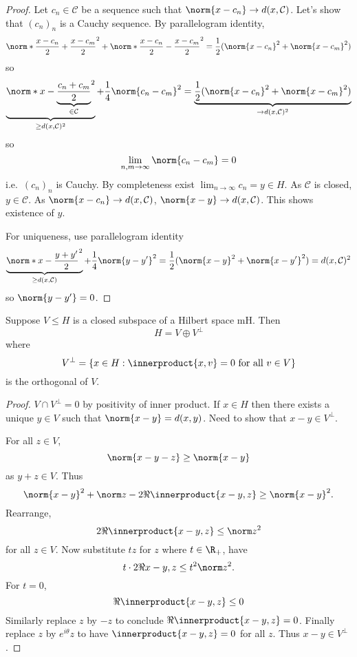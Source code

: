 \documentclass[a4paper]{article}
\newcommand*{\ip}{\innerproduct} %
\begin{document}
\begin{proof}
  Let \(c_n \in \mathcal C\) be a sequence such that \(\norm{x - c_n} \to d(x, \mathcal C)\). Let's show that \((c_n)_n\) is a Cauchy sequence. By parallelogram identity,
  \[
    \norm*{\frac{x - c_n}{2} + \frac{x - c_m}{2}}^2 + \norm*{\frac{x - c_n}{2} - \frac{x - c_m}{2}}^2 
    = \frac{1}{2} (\norm{x - c_n}^2 + \norm{x - c_m}^2)
  \]
  so
  \[
    \underbrace{\norm*{x - \underbrace{\frac{c_n + c_m}{2}}_{\in \mathcal C}}^2}_{\geq d(x, \mathcal C)^2} + \frac{1}{4} \norm{c_n - c_m}^2
    = \underbrace{\frac{1}{2} (\norm{x - c_n}^2 + \norm{x - c_m}^2)}_{\to d(x, \mathcal C)^2}
  \]
  so
  \[
    \lim_{n, m \to \infty} \norm{c_n - c_m} = 0
  \]
  i.e.\ \((c_n)_n\) is Cauchy. By completeness exist \(\lim_{n \to \infty} c_n = y \in H\). As \(\mathcal C\) is closed, \(y \in \mathcal C\). As \(\norm{x - c_n} \to d(x, \mathcal C)\), \(\norm{x - y} \to d(x, \mathcal C)\). This shows existence of \(y\).

  For uniqueness, use parallelogram identity
  \[
    \underbrace{\norm*{x - \frac{y + y'}{2}}^2}_{\geq d(x, \mathcal C)} + \frac{1}{4} \norm{y - y'}^2 = \frac{1}{2} (\norm{x - y}^2 + \norm{x - y'}^2) = d(x, \mathcal C)^2
  \]
  so \(\norm{y - y'} = 0\).
\end{proof}

\begin{corollary}
  Suppose \(V \leq H\) is a closed subspace of a Hilbert space mH. Then
  \[
    H = V \oplus V^\perp
  \]
  where
  \[
    V^\perp = \{x \in H: \ip{x, v} = 0 \text{ for all } v \in V\}
  \]
  is the orthogonal of \(V\).
\end{corollary}

\begin{proof}
  \(V \cap V^\perp = 0\) by positivity of inner product. If \(x \in H\) then there exists a unique \(y \in V\) such that \(\norm{x - y} = d(x, y)\). Need to show that \(x - y \in V^\perp\).

  For all \(z \in V\),
  \[
    \norm{x - y - z} \geq \norm{x - y}
  \]
  as \(y + z \in V\). Thus
  \[
    \norm{x - y}^2 + \norm z - 2 \Re \ip{x - y, z} \geq \norm{x - y}^2.
  \]
  Rearrange,
  \[
    2\Re \ip{x - y, z} \leq \norm z^2
  \]
  for all \(z \in V\). Now substitute \(tz\) for \(z\) where \(t \in \R_+\), have
  \[
    t \cdot 2 \Re{x - y, z} \leq t^2 \norm z^2.
  \]
  For \(t = 0\),
  \[
    \Re \ip{x - y, z} \leq 0
  \]
  Similarly replace \(z\) by \(-z\) to conclude \(\Re \ip{x - y, z} = 0\). Finally replace \(z\) by \(e^{i\theta}z\) to have \(\ip{x - y, z} = 0\) for all \(z\). Thus \(x - y \in V^\perp\).
\end{proof}
\end{document}
